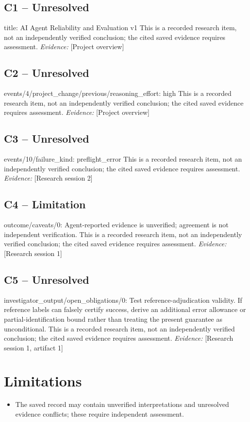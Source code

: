 \documentclass[11pt]{article}
\begin{document}
\subsection{C1 -- Unresolved}
title: AI Agent Reliability and Evaluation v1
This is a recorded research item, not an independently verified conclusion; the cited saved evidence requires assessment.
\textit{Evidence: }[Project overview]
\subsection{C2 -- Unresolved}
events/4/project\_change/previous/reasoning\_effort: high
This is a recorded research item, not an independently verified conclusion; the cited saved evidence requires assessment.
\textit{Evidence: }[Project overview]
\subsection{C3 -- Unresolved}
events/10/failure\_kind: preflight\_error
This is a recorded research item, not an independently verified conclusion; the cited saved evidence requires assessment.
\textit{Evidence: }[Research session 2]
\subsection{C4 -- Limitation}
outcome/caveats/0: Agent-reported evidence is unverified; agreement is not independent verification.
This is a recorded research item, not an independently verified conclusion; the cited saved evidence requires assessment.
\textit{Evidence: }[Research session 1]
\subsection{C5 -- Unresolved}
investigator\_output/open\_obligations/0: Test reference-adjudication validity. If reference labels can falsely certify success, derive an additional error allowance or partial-identification bound rather than treating the present guarantee as unconditional.
This is a recorded research item, not an independently verified conclusion; the cited saved evidence requires assessment.
\textit{Evidence: }[Research session 1, artifact 1]
\section{Limitations}
\begin{itemize}
\item The saved record may contain unverified interpretations and unresolved evidence conflicts; these require independent assessment.
\end{itemize}
\end{document}
